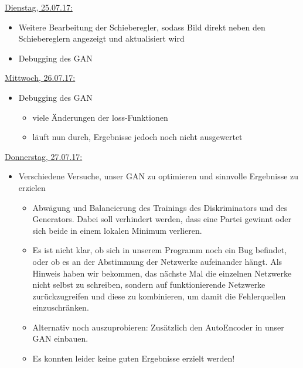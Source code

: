 \documentclass[10pt,a4paper]{report}
\begin{document}
\bigskip
\uline{Dienstag, 25.07.17:}
\begin{itemize}
\item Weitere Bearbeitung der Schieberegler, sodass Bild direkt neben den Schiebereglern angezeigt und aktualisiert wird
\item Debugging des GAN
\end{itemize}

\bigskip
\uline{Mittwoch, 26.07.17:}
\begin{itemize}
\item Debugging des GAN
\begin{itemize}
\item viele Änderungen der loss-Funktionen
\item läuft nun durch, Ergebnisse jedoch noch nicht ausgewertet
\end{itemize}
\end{itemize}

\bigskip
\uline{Donnerstag, 27.07.17:}
\begin{itemize}
\item Verschiedene Versuche, unser GAN zu optimieren und sinnvolle Ergebnisse zu erzielen
\begin{itemize}
\item Abwägung und Balancierung des Trainings des Diskriminators und des Generators. Dabei soll verhindert werden, dass eine Partei gewinnt oder sich beide in einem lokalen Minimum verlieren.
\item Es ist nicht klar, ob sich in unserem Programm noch ein Bug befindet, oder ob es an der Abstimmung der Netzwerke aufeinander hängt. Als Hinweis haben wir bekommen, das nächste Mal die einzelnen Netzwerke nicht selbst zu schreiben, sondern auf funktionierende Netzwerke zurückzugreifen und diese zu kombinieren, um damit die Fehlerquellen einzuschränken.
\item Alternativ noch auszuprobieren: Zusätzlich den AutoEncoder in unser GAN einbauen.
\item Es konnten leider keine guten Ergebnisse erzielt werden! 
\end{itemize}
\end{itemize}
\end{document}
